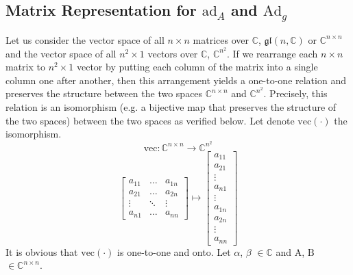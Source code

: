 \documentclass[11pt,a4paper]{article}
\begin{document}
\subsection{Matrix Representation for $\mathrm{ad}_{A}$ and $\mathrm{Ad}_{g}$}
\qquad  Let us consider the vector space of all $n\times n$ matrices over $\mathbb{C}$, $\mathfrak{gl}(n,\mathbb{C})$ or $\mathbb{C}^{n\times n}$ and the vector space of all $n^2\times 1$ vectors over $\mathbb{C}$, $\mathbb{C}^{n^2}$. If we rearrange each $n\times n$ matrix to $n^2\times 1$ vector by putting each column of the matrix into a single column one after another, then this arrangement yields a one-to-one relation and preserves the structure between the two spaces $\mathbb{C}^{n\times n}$ and $\mathbb{C}^{n^2}$. Precisely, this relation is an isomorphism (e.g. a bijective map that preserves the structure of the two spaces) between the two spaces as verified below. Let denote $\mathrm{vec}(\cdot)$ the isomorphism.
$$
\mathrm{vec} : \mathbb{C}^{n\times n}\longrightarrow \mathbb{C}^{n^2}
$$
$$
	\begin{bmatrix}
 		a_{11} &  \ldots & a_{1n} \\
 		a_{21} &  \ldots & a_{2n} \\
 		\vdots &  \ddots & \vdots \\
 		a_{n1} &  \ldots & a_{nn} 
	\end{bmatrix}
	\longmapsto
	\begin{bmatrix}
 		a_{11}  \\
 		a_{21} \\
 		\vdots \\
 		a_{n1} \\
 	\hline	
 		\vdots \\
 	\hline	
 		a_{1n} \\
 		a_{2n} \\ 
 		\vdots \\
 		a_{nn}
	\end{bmatrix}
$$
It is obvious that $\mathrm{vec}(\cdot)$ is one-to-one and onto. Let $\alpha$, $\beta$ $\in \mathbb{C}$ and $\mathrm{A}$, $\mathrm{B}$ $\in \mathbb{C}^{n\times n}$.
\end{document}
